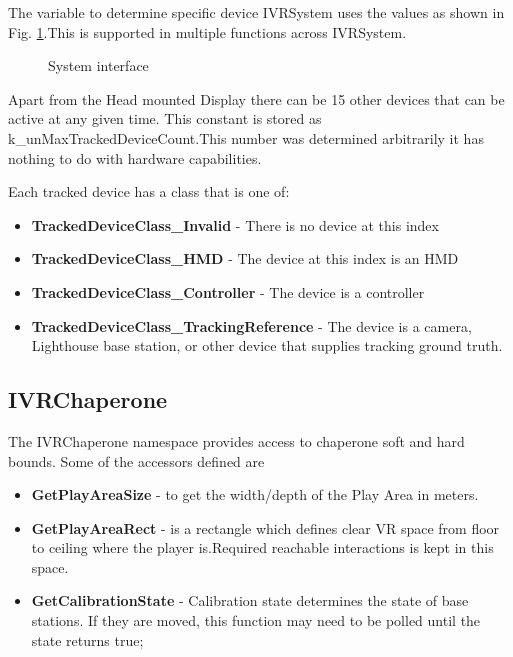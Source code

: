 \documentclass[journal]{IEEEtran}
\begin{document}
The variable to determine specific device IVRSystem uses the values as shown in Fig. \ref{fig:ivrsys}.This is supported in multiple functions across IVRSystem.

\begin{figure}[H]
		\noindent

	\caption{System interface \cite{openVR_fn_images} \label{fig:ivrsys}}
\end{figure}

Apart from the Head mounted Display there can be 15 other devices that can be active at any given time. This constant is stored as k\_unMaxTrackedDeviceCount.This number was determined arbitrarily it has nothing to do with hardware capabilities. 

Each tracked device has a class that is one of:

\begin{itemize}
	\item \textbf{TrackedDeviceClass\_Invalid} - There is no device at this index
	\item \textbf{TrackedDeviceClass\_HMD} - The device at this index is an HMD
	\item \textbf{TrackedDeviceClass\_Controller} - The device is a controller
	\item \textbf{TrackedDeviceClass\_TrackingReference} - The device is a camera, Lighthouse base station, or other device that supplies tracking ground truth.
\end{itemize}

\subsection{IVRChaperone}
The IVRChaperone namespace provides access to chaperone soft and hard bounds. Some of the accessors defined are

\begin{itemize}
	\item \textbf{GetPlayAreaSize} - to get the width/depth of the Play Area in meters.
	\item \textbf{GetPlayAreaRect} - is a rectangle which defines clear VR space from floor to ceiling where the player is.Required reachable interactions is kept in this space. 
	\item \textbf{GetCalibrationState} - Calibration state determines the state of base stations. If they are moved, this function may need to be polled until the state returns true; 
\end{itemize}
\end{document}

